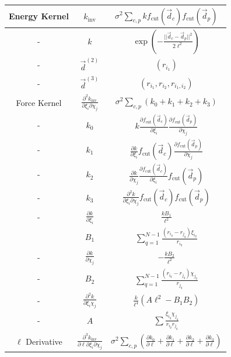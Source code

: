 \documentclass[%
superscriptaddress,
preprint,
amsmath,amssymb,
aps,
prl,
]{revtex4-1}
\begin{document}
\begin{center}
    \begin{table}
    \begin{tabular}{ |c|c|c| } 
     \hline
     Energy Kernel & $k_{\text{inv}}$ & $\sigma^2 \sum_{c, p} k f_{\text{cut}}(\vec{d}_c) f_{\text{cut}}(\vec{d}_p)$ \\ 
     \hline
     - & $k$ & $\exp\left( - \frac{||\vec{d}_c - \vec{d}_p ||^2}{2 \ell^2} \right)$\\
     \hline
     - & $\vec{d}^{(2)}$ & $(r_{i_1})$ \\
     \hline
     - & $\vec{d}^{(3)}$ & $(r_{i_1}, r_{i_2}, r_{i_1, i_2})$ \\
     \hline
    Force Kernel & $\frac{\partial^2 k_{\text{inv}}}{\partial \xi_i \partial \chi_j}$ & $\sigma^2 \sum_{c, p} (k_0 + k_1 + k_2 + k_3)$ \\ 
     \hline
     - & $k_0$ & $k \frac{\partial f_{\text{cut}}(\vec{d}_c)}{\partial \xi_i} \frac{\partial f_{\text{cut}}(\vec{d}_p)}{\partial \chi_j}$ \\ 
     \hline
     - & $k_1$ & $\frac{\partial k}{\partial \xi_i} f_{\text{cut}}(\vec{d}_c) \frac{\partial f_{\text{cut}}(\vec{d}_p)}{\partial \chi_j}$ \\ 
     \hline
     - & $k_2$ & $\frac{\partial k}{\partial \chi_j} \frac{\partial f_{\text{cut}}(\vec{d}_c)}{\partial \xi_i} f_{\text{cut}}(\vec{d}_p)$ \\ 
     \hline
     - & $k_3$ & $\frac{\partial^2 k}{\partial \xi_i \partial \chi_j} f_{\text{cut}}(\vec{d}_c) f_{\text{cut}}(\vec{d}_p)$ \\ 
     \hline
     - & $\frac{\partial k}{\partial \xi_i}$ & $\frac{k B_1}{\ell^2}$ \\ 
     \hline
     & $B_1$ & $\sum_{q=1}^{N-1} \frac{(r_{i_q} - r_{j_q})\xi_{i_q}}{r_{i_q}}$ \\
     \hline
     - & $\frac{\partial k}{\partial \chi_j}$ &  $-\frac{k B_2}{\ell^2}$ \\ 
     \hline
    - & $B_2$ & $\sum_{q=1}^{N-1} \frac{(r_{i_q} - r_{j_q})\chi_{j_q}}{r_{j_q}}$ \\
     \hline
     - & $\frac{\partial^2 k}{\partial \xi_i \chi_j}$ & $\frac{k}{\ell^4} \left(A \ell^2 -B_1 B_2 \right)$\\ 
     \hline
     - & $A$ & $\sum \frac{\xi_{i_q} \chi_{j_q}}{r_{i_q} r_{j_q}}$ \\
     \hline
     $\ell$ Derivative & $\frac{\partial^3 k_{\text{inv}}}{\partial \ell \partial \xi_i \partial \chi_j}$ & $\sigma^2 \sum_{c, p} \left(\frac{\partial k_0}{\partial \ell} + \frac{\partial k_1}{\partial \ell} + \frac{\partial k_2}{\partial \ell} + \frac{\partial k_3}{\partial \ell}\right)$ \\

\end{tabular}
\end{table}
\end{center}
\end{document}
